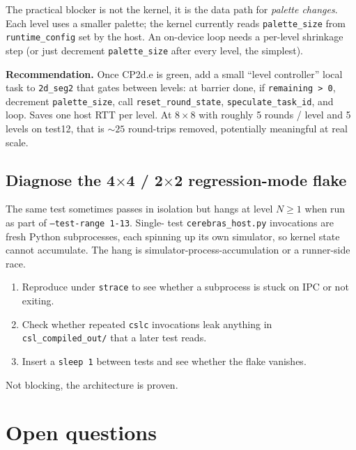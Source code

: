 \documentclass[11pt]{article}
\newcommand{\code}[1]{\texttt{#1}}
\newcommand{\file}[1]{\texttt{#1}}
\begin{document}
The practical blocker is not the kernel, it is the data path for
\emph{palette changes}. Each level uses a smaller palette; the
kernel currently reads \code{palette\_size} from
\code{runtime\_config} set by the host. An on-device loop needs a
per-level shrinkage step (or just decrement
\code{palette\_size} after every level, the simplest).

\textbf{Recommendation.} Once CP2d.e is green, add a small
``level controller'' local task to \code{2d\_seg2} that gates
between levels: at barrier done, if \code{remaining > 0},
decrement \code{palette\_size}, call \code{reset\_round\_state},
\code{speculate\_task\_id}, and loop. Saves one host RTT per
level. At $8\times 8$ with roughly 5 rounds / level and 5 levels
on test12, that is $\sim 25$ round-trips removed, potentially
meaningful at real scale.

\subsection{Diagnose the 4$\times$4 / 2$\times$2 regression-mode flake}
The same test sometimes passes in isolation but hangs at level
$N \ge 1$ when run as part of \code{--test-range 1-13}. Single-
test \code{cerebras\_host.py} invocations are fresh Python
subprocesses, each spinning up its own simulator, so kernel state
cannot accumulate. The hang is simulator-process-accumulation or
a runner-side race.

\begin{enumerate}[leftmargin=1.3em,itemsep=0.2em]
  \item Reproduce under \code{strace} to see whether a subprocess
    is stuck on IPC or not exiting.
  \item Check whether repeated \code{cslc} invocations leak
    anything in \file{csl\_compiled\_out/} that a later test
    reads.
  \item Insert a \code{sleep 1} between tests and see whether
    the flake vanishes.
\end{enumerate}

Not blocking, the architecture is proven.

\section{Open questions}
\end{document}

